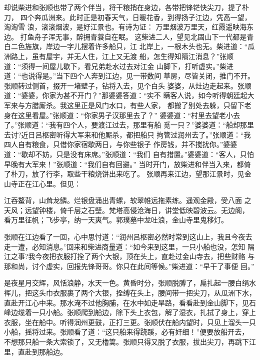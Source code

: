 却说柴进和张顺也带了两个伴当，将干粮捎在身边，各带把锋铓快尖刀，提了朴刀，
四个奔瓜洲来。此时正是初春天气，日暖花香，到得扬子江边，凭高一望，淘淘雪
浪，滚滚烟波，是好江景也。有诗为证：
万里烟波万里天，红霞遥映海东边。
打鱼舟子浑无事，醉拥青蓑自在眠。
这柴进二人，望见北固山下一代都是青白二色旌旗，岸边一字儿摆着许多船只，江
北岸上，一根木头也无。柴进道：“瓜洲路上，虽有屋宇，并无人住，江上又无渡
船，怎生得知隔江消息？”张顺道：“须得一间屋儿歇下，看兄弟赴水过去对江金
山脚下，打听虚实。”柴进道：“也说得是。”当下四个人奔到江边，见一带数间
草房，尽皆关闭，推门不开。张顺转过侧首，掇开一堵壁子，钻将入去，见个白头
婆婆，从灶边走起来。张顺道：“婆婆，你家为甚不开门？”那婆婆答道：“实不
瞒客人说，如今听得朝廷起大军来与方腊厮杀。我这里正是风门水口，有些人家，
都搬了别处去躲，只留下老身在这里看屋。”张顺道：“你家男子汉那里去了？”
婆婆道：“村里去望老小去了。”张顺道：“我有四个人，要渡江过去，那里有船
觅一只？”婆婆道：“船却那里去讨?近日吕枢密听得大军来和他厮杀，都把船只
拘管过润州去了。”张顺道：“我四人自有粮食，只借你家宿歇两日，与你些银子
作房钱，并不搅扰你。”婆婆道：“歇却不妨，只是没有床席。”张顺道：“我们
自有措置。”婆婆道：“客人，只怕早晚有大军来！”张顺道：“我们自有回避。”
当时开门，放柴进和伴当入来，都倚了朴刀，放了行李，取些干粮烧饼出来吃了。
张顺再来江边，望那江景时，见金山寺正在江心里。但见：

江吞鳌背，山耸龙鳞。烂银盘涌出青螺，软翠帷远拖素练。遥观金殿，受八面
之天风；远望钟楼，倚千层之石壁。梵塔高侵沧海日，讲堂低映碧波云。无边阁，
看万里征帆；飞步亭，纳一天爽气。郭璞墓中龙吐浪，金山寺里鬼移灯。

张顺在江边看了一回，心中思忖道：“润州吕枢密必然时常到这山上，我且今夜去
走一遭，必知消息。”回来和柴进商量道：“如今来到这里，一只小船也没，怎知
隔江之事?我今夜把衣服打拴了两个大银，顶在头上，直赴过金山寺去，把些财赂
与那和尚，讨个虚实，回报先锋哥哥。你只在此间等候。”柴进道：“早干了事便
回。”

是夜星月交辉，风恬浪静，水天一色。黄昏时分，张顺脱膊了，扁扎起一腰白绢水
裈儿，把这头巾衣服裹了两个大银，拴缚在头上，腰间带一把尖刀，从瓜洲下水，
直赴开江心中来。那水淹不过他胸脯，在水中如走旱路，看看赴到金山脚下，见石
峰边缆着一只小船。张顺爬到船边，除下头上衣包，解了湿衣，扎拭了身上，穿上
衣服，坐在船中。听得润州更鼓，正打三更。张顺伏在船内望时，只见上溜头一只
小船，摇将过来。张顺看了道：“这只船来得跷蹊，必有奸细！”便要放船开去，
不想那只船一条大索锁了，又无橹篙。张顺只得又脱了衣服，拔出尖刀，再跳下江
里，直赴到那船边。

